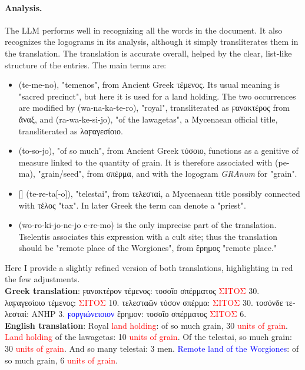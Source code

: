 \paragraph{Analysis.} The LLM performs well in recognizing all the words in the document.
It also recognizes the logograms in its analysis, although it simply transliterates them in the translation.
The translation is accurate overall, helped by the clear, list-like structure of the entries.
The main terms are:
\begin{itemize}
  \item \textlinb{\Bte\Bme\Bno} (te-me-no), "temenos", from Ancient Greek \textgreek{τέμενος}. Its usual meaning is "sacred precinct", but here it is used for a land holding.
  The two occurrences are modified by \textlinb{\Bwa\Bna\Bka\Bte\Bro} (wa-na-ka-te-ro), "royal", transliterated as \textgreek{ϝανακτέρος} from \textgreek{ἄναξ}, and \textlinb{\Bra\Bwa\Be\Bke\Bsi\Bjo} (ra-wa-ke-si-jo), "of the lawagetas", a Mycenaean official title, transliterated as \textgreek{λαϝαγεσίοιο}.
  \item \textlinb{\Bto\Bo\Bso\Bo\Bjo} (to-so-jo), "of so much", from Ancient Greek \textgreek{τόσοιο}, functions as a genitive of measure linked to the quantity of grain.
  It is therefore associated with \textlinb{\Bpe\Bma} (pe-ma), "grain/seed", from \textgreek{σπέρμα}, and with the logogram \textit{GRAnum} for "grain".
  \item \textlinb{\Bte\Bre\Bta}[\textlinb{\Bo}] (te-re-ta[-o]), "telestai", from \textgreek{τελεσταί}, a Mycenaean title possibly connected with \textgreek{τέλος} "tax". In later Greek the term can denote a "priest".
  \item \textlinb{\Bwo\Bro\Bki\Bo\Bjo\Bne\Bjo} \textlinb{\Be\Bre\Bmo} (wo-ro-ki-jo-ne-jo e-re-mo) is the only imprecise part of the translation.
  Tselentis associates this expression with a cult site; thus the translation should be "remote place of the Worgiones", from \textgreek{ἔρημος} "remote place."

\end{itemize}
Here I provide a slightly refined version of both translations, highlighting in red the few adjustments. \\
\textbf{Greek translation}: \textgreek{ϝανακτέρον τέμενος: τοσοῖο σπέρματος} \textcolor{red}{\textgreek{ΣΙΤΟΣ}} \textgreek{30. λαϝαγεσίοιο τέμενος:} \textcolor{red}{\textgreek{ΣΙΤΟΣ}} \textgreek{10. τελεσταῶν τόσον σπέρμα:} \textcolor{red}{\textgreek{ΣΙΤΟΣ}} \textgreek{30. τοσόνδε τελεσταί: ΑΝΗΡ 3.} \textcolor{blue}{\textgreek{ϝοργιώνειοιον}} \textgreek{ἔρημον: τοσοῖο σπέρματος} \textcolor{red}{\textgreek{ΣΙΤΟΣ}} \textgreek{6.} \\
\textbf{English translation}: Royal \textcolor{red}{land holding}: of so much grain, 30 \textcolor{red}{units of grain}. \textcolor{red}{Land holding} of the lawagetas: 10 \textcolor{red}{units of grain}. Of the telestai, so much grain: 30 \textcolor{red}{units of grain}. And so many telestai: 3 men. \textcolor{blue}{Remote land of the Worgiones}: of so much grain, 6 \textcolor{red}{units of grain}.


